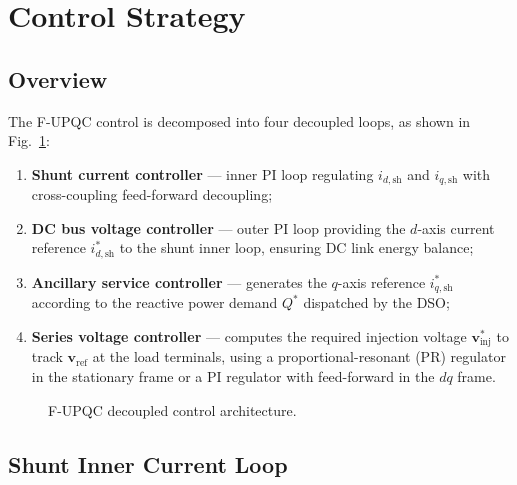 \documentclass[conference]{IEEEtran}
\begin{document}

\section{Control Strategy}
\label{sec:control}

\subsection{Overview}

The F-UPQC control is decomposed into four decoupled loops, as shown
in Fig.~\ref{fig:control_overview}:
\begin{enumerate}
  \item \textbf{Shunt current controller} --- inner PI loop regulating
        $i_{d,\text{sh}}$ and $i_{q,\text{sh}}$ with cross-coupling
        feed-forward decoupling;
  \item \textbf{DC bus voltage controller} --- outer PI loop providing
        the $d$-axis current reference $i_{d,\text{sh}}^*$ to the shunt
        inner loop, ensuring DC link energy balance;
  \item \textbf{Ancillary service controller} --- generates the
        $q$-axis reference $i_{q,\text{sh}}^*$ according to the
        reactive power demand $Q^*$ dispatched by the DSO;
  \item \textbf{Series voltage controller} --- computes the required
        injection voltage $\bm{v}_\text{inj}^*$ to track
        $\bm{v}_\text{ref}$ at the load terminals, using a
        proportional-resonant (PR) regulator in the stationary frame
        or a PI regulator with feed-forward in the $dq$ frame.
\end{enumerate}

\begin{figure}[htbp]
  \centering
  \caption{F-UPQC decoupled control architecture.}
  \label{fig:control_overview}
\end{figure}

\subsection{Shunt Inner Current Loop}
\end{document}
